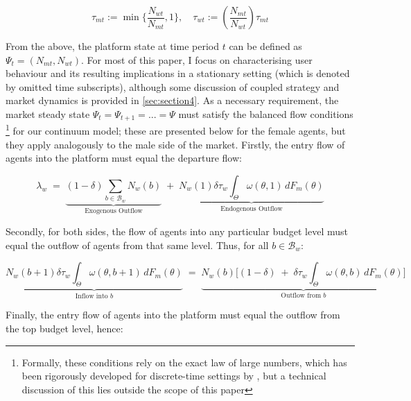 
\begin{equation*}
    \tau_{mt}:=\min \Big\{\frac{N_{wt}}{N_{mt}} ,1 \Big\}, \quad \tau_{wt}:= \left(\frac{N_{mt}}{N_{wt}}\right) \tau_{mt} 
\end{equation*}


From the above, the platform state at time period $t$ can be defined as $\Psi_t=(N_{mt},N_{wt})$. For most of this paper, I focus on characterising user behaviour and its resulting implications in a stationary setting (which is denoted by omitted time subscripts), although some discussion of coupled strategy and market dynamics is provided in \autoref{sec:section4}. As a necessary requirement, the market steady state $\Psi_t=\Psi_{t+1}=...=\Psi$ must satisfy the balanced flow conditions \footnote{Formally, these conditions rely on the exact law of large numbers, which has been rigorously developed for discrete-time settings by \cite{duffie2018dynamic}, but a technical discussion of this lies outside the scope of this paper} for our continuum model; these are presented below for the female agents, but they apply analogously to the male side of the market. Firstly, the entry flow of agents into the platform must equal the departure flow: 

\begin{equation}\label{eq:ss1} 
    \lambda_w\;=\; \underbrace{ (1-\delta)\sum_{b\in\mathcal{B}_w}N_w(b)}_{\text{Exogenous Outflow}} \;+\; \underbrace{N_w(1) \delta \tau_w\int_{\Theta}\omega(\theta,1)\,dF_{m}(\theta)}_{\text{Endogenous Outflow}} 
\end{equation} 

Secondly, for both sides, the flow of agents into any particular budget level must equal the outflow of agents from that same level. Thus, for all $b\in\mathcal{B}_w$: 

\begin{equation}\label{eq:ss2} 
    \underbrace{N_w(b+1) \delta \tau_w \int_{\Theta} \omega(\theta,b+1)\,dF_{m}(\theta)}_{\text{Inflow into $b$}} \;=\; \underbrace{N_w(b) \Big[ (1-\delta) \;+\; \delta \tau_w\int_{\Theta} \omega(\theta,b)\,dF_{m}(\theta)\Big]}_{\text{Outflow from $b$}}
\end{equation}

Finally, the entry flow of agents into the platform must equal the outflow from the top budget level, hence:

